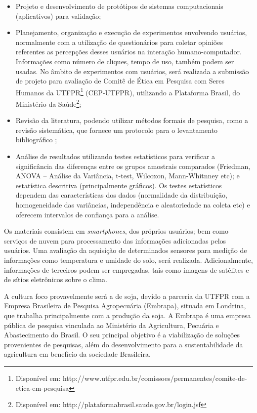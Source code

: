 \documentclass[12pt]{article}
\begin{document}
\begin{itemize}
	\item Projeto e desenvolvimento de protótipos de sistemas computacionais (aplicativos) para validação;
	\item Planejamento, organização e execução de experimentos envolvendo usuários, normalmente com a utilização de questionários para coletar opiniões referentes as percepções desses usuários na interação humano-computador. Informações como número de cliques, tempo de uso, também podem ser usadas. No âmbito de experimentos com usuários, será realizada a submissão de projeto para avaliação de Comitê de Ética em Pesquisa com Seres Humanos da UTFPR\footnote{Disponível em: http://www.utfpr.edu.br/comissoes/permanentes/comite-de-etica-em-pesquisa} (CEP-UTFPR), utilizando a Plataforma Brasil, do Ministério da Saúde\footnote{Disponível em: http://plataformabrasil.saude.gov.br/login.jsf};
	\item Revisão da literatura, podendo utilizar métodos formais de pesquisa, como a revisão sistemática, que fornece um protocolo para o levantamento bibliográfico \cite{Kitchenham:2004};
	\item Análise de resultados utilizando testes estatísticos para verificar a significância das diferenças entre os grupos amostrais comparados (Friedman, ANOVA – Análise da Variância, t-test, Wilcoxon, Mann-Whitnney etc); e estatística descritiva (principalmente gráficos). Os testes estatísticos dependem das características dos dados (normalidade da distribuição, homogeneidade das variâncias, independência e aleatoriedade na coleta etc) e oferecem intervalos de confiança para a análise.
\end{itemize}

Os materiais consistem em \textit{smartphones}, dos próprios usuários; bem como serviços de nuvem para processamento das informações adicionadas pelos usuários. Uma avaliação da aquisição de determinados sensores para medição de informações como temperatura e umidade do solo, será realizada. Adicionalmente, informações de terceiros podem ser empregadas, tais como imagens de satélites e de sítios eletrônicos sobre o clima. 		

A cultura foco provavelmente será a de soja, devido a parceria da UTFPR com a Empresa Brasileira de Pesquisa Agropecuária (Embrapa), situada em Londrina, que trabalha principalmente com a produção da soja. A Embrapa é uma empresa pública de pesquisa vinculada ao Ministério da Agricultura, Pecuária e Abastecimento do Brasil. O seu principal objetivo é a viabilização de soluções provenientes de pesquisas, além do desenvolvimento para a sustentabilidade da agricultura em benefício da sociedade Brasileira. 
\end{document}
